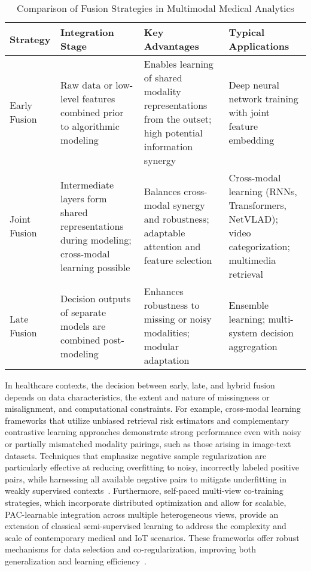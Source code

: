 \documentclass[sigconf]{acmart}
\begin{document}
\begin{table*}[htbp]
\centering
\caption{Comparison of Fusion Strategies in Multimodal Medical Analytics}
\label{tab:fusion_strategies}
\begin{adjustbox}{max width=\textwidth}
\begin{tabular}{llll}
\toprule
\textbf{Strategy} & \textbf{Integration Stage} & \textbf{Key Advantages} & \textbf{Typical Applications} \\
\midrule
Early Fusion & Raw data or low-level features combined prior to algorithmic modeling & Enables learning of shared modality representations from the outset; high potential information synergy & Deep neural network training with joint feature embedding \\
Joint Fusion & Intermediate layers form shared representations during modeling; cross-modal learning possible & Balances cross-modal synergy and robustness; adaptable attention and feature selection & Cross-modal learning (RNNs, Transformers, NetVLAD); video categorization; multimedia retrieval \\
Late Fusion & Decision outputs of separate models are combined post-modeling & Enhances robustness to missing or noisy modalities; modular adaptation & Ensemble learning; multi-system decision aggregation \\
\bottomrule
\end{tabular}
\end{adjustbox}
\end{table*}

In healthcare contexts, the decision between early, late, and hybrid fusion depends on data characteristics, the extent and nature of missingness or misalignment, and computational constraints. For example, cross-modal learning frameworks that utilize unbiased retrieval risk estimators and complementary contrastive learning approaches demonstrate strong performance even with noisy or partially mismatched modality pairings, such as those arising in image-text datasets. Techniques that emphasize negative sample regularization are particularly effective at reducing overfitting to noisy, incorrectly labeled positive pairs, while harnessing all available negative pairs to mitigate underfitting in weakly supervised contexts~\cite{ref64,ref61,ref104}. Furthermore, self-paced multi-view co-training strategies, which incorporate distributed optimization and allow for scalable, PAC-learnable integration across multiple heterogeneous views, provide an extension of classical semi-supervised learning to address the complexity and scale of contemporary medical and IoT scenarios. These frameworks offer robust mechanisms for data selection and co-regularization, improving both generalization and learning efficiency~\cite{ref54,ref60,ref62,ref105}.
\end{document}
